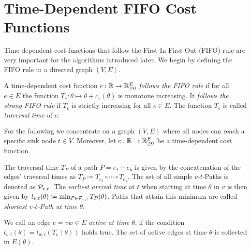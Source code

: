 \section{Time-Dependent FIFO Cost Functions}\label{sec:fifo-costs}

Time-dependent cost functions that follow the First In First Out (FIFO) rule are very important for the algorithms introduced later.
We begin by defining the FIFO rule in a directed graph $(V, E)$.


\begin{definition}
    A time-dependent cost function $c: \mathbb{R}\rightarrow \mathbb{R}_{\geq0}^E$ \emph{follows the FIFO rule} if for all $e\in E$ the function $T_e: \theta\mapsto \theta + c_e(\theta)$ is monotone increasing.
    It \emph{follows the strong FIFO rule} if $T_e$ is strictly increasing for all $e\in E$.
    The function $T_e$ is called \emph{traversal time} of $e$.
\end{definition}

For the following we concentrate on a graph $(V,E)$ where all nodes can reach a specific sink node $t\in V$.
Moreover, let $c:\mathbb{R}\rightarrow \mathbb{R}_{\geq0}^E$ be a time-dependent cost function.

The traversal time $T_P$ of a path $P = e_1\,\cdots\,e_k$ is given by the concatenation of the edges' traversal times as $T_P \coloneqq T_{e_k} \circ \cdots \circ T_{e_1}$.
The set of all simple $v$-$t$-Paths is denoted as $\mathcal{P}_{v,t}$.
The \emph{earliest arrival time} at $t$ when starting at time $\theta$ in $v$ is then given by $l_{v,t}(\theta)\coloneqq \min_{P\in\mathcal{P}_{v,t}} T_P(\theta)$.
Paths that attain this minimum are called \emph{shortest $v$-$t$-Path at time $\theta$}.

We call an edge $e=vw\in E$ \emph{active at time $\theta$}, if the condition $l_{v,t}(\theta) = l_{w,t}(T_e(\theta))$ holds true.
The set of active edges at time $\theta$ is collected in $E(\theta)$.







